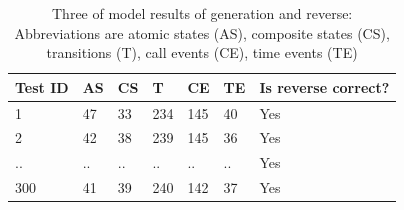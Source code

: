 \begin{table}
\centering
\caption{Three of model results of generation and reverse: Abbreviations are atomic states (AS), composite states (CS), transitions (T), call events (CE), time events (TE)}
\label{table:law1-resultat}
\begin{tabular}{|l|l|l|l|l|l|l|}
\hline
\rowcolor{Gray}
Test ID & AS & CS & T & CE & TE & Is reverse correct? \\ \hline
1       & 47 & 33 & 234 & 145 & 40 & Yes                 \\ \hline
2       & 42 & 38 & 239 & 145 & 36 & Yes                 \\ \hline
..      & .. & .. & .. & .. & .. & Yes                 \\ \hline
300       & 41 & 39 &240 & 142 & 37 & Yes                 \\ \hline
\end{tabular}
\end{table}
 
